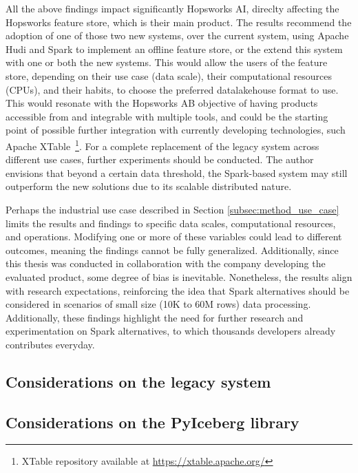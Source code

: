 All the above findings impact significantly Hopsworks AI, direclty affecting the Hopsworks feature store, which is their main product. The results recommend the adoption of one of those two new systems, over the current system, using Apache Hudi and Spark to implement an offline feature store, or the extend this system with one or both the new systems. This would allow the users of the feature store, depending on their use case (data scale), their computational resources (\glspl{CPU}), and their habits, to choose the preferred datalakehouse format to use. This would resonate with the Hopsworks AB objective of having products accessible from and integrable with multiple tools, and could be the starting point of possible further integration with currently developing technologies, such Apache XTable~\footnote{XTable repository available at \url{https://xtable.apache.org/}}. For a complete replacement of the legacy system across different use cases, further experiments should be conducted. The author envisions that beyond a certain data threshold, the Spark-based system may still outperform the new solutions due to its scalable distributed nature.

Perhaps the industrial use case described in Section \ref{subsec:method_use_case} limits the results and findings to specific data scales, computational resources, and operations. Modifying one or more of these variables could lead to different outcomes, meaning the findings cannot be fully generalized. Additionally, since this thesis was conducted in collaboration with the company developing the evaluated product, some degree of bias is inevitable. Nonetheless, the results align with research expectations, reinforcing the idea that Spark alternatives should be considered in scenarios of small size (10K to 60M rows) data processing. Additionally, these findings highlight the need for further research and experimentation on Spark alternatives, to which thousands developers already contributes everyday.



\subsection{Considerations on the legacy system}









\subsection{Considerations on the PyIceberg library}